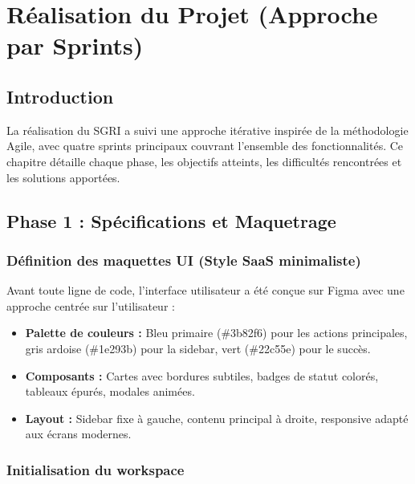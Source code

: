 \documentclass[12pt,a4paper,twoside]{report}
\begin{document}
\chapter{Réalisation du Projet (Approche par Sprints)}

\section{Introduction}

La réalisation du SGRI a suivi une approche itérative inspirée de la méthodologie Agile, avec quatre sprints principaux couvrant l'ensemble des fonctionnalités. Ce chapitre détaille chaque phase, les objectifs atteints, les difficultés rencontrées et les solutions apportées.

\section{Phase 1 : Spécifications et Maquetrage}

\subsection{Définition des maquettes UI (Style SaaS minimaliste)}

Avant toute ligne de code, l'interface utilisateur a été conçue sur Figma avec une approche centrée sur l'utilisateur :

\begin{itemize}
    \item \textbf{Palette de couleurs :} Bleu primaire (\#3b82f6) pour les actions principales, gris ardoise (\#1e293b) pour la sidebar, vert (\#22c55e) pour le succès.
    \item \textbf{Composants :} Cartes avec bordures subtiles, badges de statut colorés, tableaux épurés, modales animées.
    \item \textbf{Layout :} Sidebar fixe à gauche, contenu principal à droite, responsive adapté aux écrans modernes.
\end{itemize}

\subsection{Initialisation du workspace}
\end{document}
